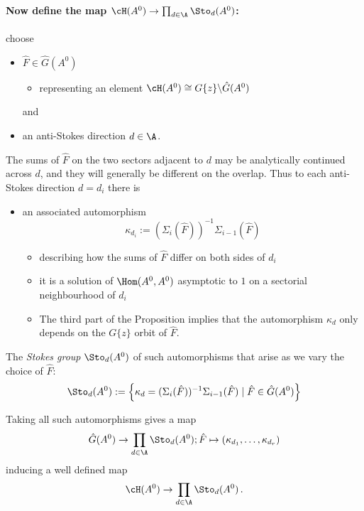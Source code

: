 \paragraph{Now define the map $\cH(A^0)\to\prod_{d\in\A}\Sto_d(A^0)$:} choose
\begin{itemize}
  \item $\hat F\in\hat G(A^0)$
    \begin{itemize}
      \item representing an element
        $\cH(A^0)\cong G\{z\}\backslash\hat G(A^0)$
    \end{itemize}
    and
  \item an anti-Stokes direction $d\in\A$.
\end{itemize}
The sums of $\hat F$ on the two sectors adjacent to $d$ may be analytically
continued across $d$, and they will generally be different on the overlap. Thus
to each anti-Stokes direction $d=d_i$ there is
\begin{itemize}
  \item an associated automorphism
    \[
      \kappa_{d_i}:=(\Sigma_i(\hat F))^{-1}\Sigma_{i-1}(\hat F)
    \]
    \begin{itemize}
      \item describing how the sums of $\hat F$ differ on both sides of $d_i$
      \item it is a solution of $\Hom(A^0,A^0)$ asymptotic to $1$ on a
        sectorial neighbourhood of $d_i$
      \item The third part of the Proposition implies that the automorphism
        $\kappa_d$ only depends on the $G\{z\}$ orbit of $\hat F$.
    \end{itemize}
\end{itemize}
\begin{defn}
  The \emph{Stokes group} $\Sto_d(A^0)$ of such automorphisms that arise as we
  vary the choice of $\hat F$:
  \[
    \Sto_d(A^0):=
      \left\{\kappa_d=(\Sigma_i(\hat F))^{-1}\Sigma_{i-1}(\hat F)
        \mid \hat F\in\hat G(A^0)\right\}
  \]
\end{defn}
Taking all such automorphisms gives a map
\[
  \hat G(A^0)\to\prod_{d\in\A}\Sto_d(A^0);
    \hat F\mapsto(\kappa_{d_1},\dots,\kappa_{d_r})
\]
inducing a well defined map
\[
  \cH(A^0)\to\prod_{d\in\A}\Sto_d(A^0) \,.
\]
\begin{comment}
  Using the Proposition:
  \begin{align*}
    \kappa_{d_i}&=(\Sigma_i(\hat F))^{-1}\Sigma_{i-1}(\hat F)
    \\&=(\Sigma_i(\hat F))^{-1}g^{-1}g\Sigma_{i-1}(\hat F)
    \\&=(g\Sigma_i(\hat F))^{-1}g\Sigma_{i-1}(\hat F)
    \\&=(\Sigma_i(g\hat F))^{-1}\Sigma_{i-1}(g\hat F)
  \end{align*}
\end{comment}

